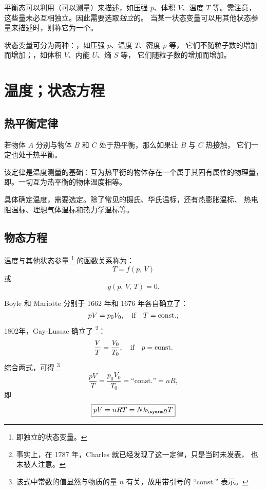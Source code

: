 平衡态可以利用（可以测量）来描述，如压强 $p$、体积 $V$、温度 $T$
等。需注意，这些量未必互相独立。因此需要选取\emph{独立}的。
当某一状态变量可以用其他状态参量来描述时，则称它为一个。

状态变量可分为两种：，如压强 $p$、温度 $T$、密度 $\rho$ 等，
它们不随粒子数的增加而增加；，如体积 $V$、内能 $U$、熵 $S$ 等，
它们随粒子数的增加而增加。

\section{温度；状态方程}

\subsection{热平衡定律}

\begin{theorem}
  若物体 $A$ 分别与物体 $B$ 和 $C$ 处于热平衡，那么如果让 $B$ 与 $C$ 热接触，
  它们一定也处于热平衡。
\end{theorem}

该定律是温度测量的基础：互为热平衡的物体存在一个属于其固有属性的物理量，
即。一切互为热平衡的物体温度相等。

具体确定温度，需要选定。除了常见的摄氏、华氏温标，还有热膨胀温标、
热电阻温标、理想气体温标和热力学温标等。

\subsection{物态方程}

温度与其他状态参量 \footnote{即独立的状态变量。} 的函数关系称为：
\begin{equation}
  T = f(p, \, V)
\end{equation}
或
\begin{equation}
  g(p, \, V, \, T) = 0.
\end{equation}

Boyle 和 Mariotte 分别于 1662 年和 1676 年各自确立了：
\begin{equation}
  pV = p_0 V_0 \qc\qif* T = \const;
\end{equation}
1802年，Gay-Lussac 确立了
\footnote{事实上，在 1787 年，Charles 就已经发现了这一定律，只是当时未发表，
  也未被人注意。}：
\begin{equation}
  \frac{V}{T} = \frac{V_0}{T_0} \qc\qif* p = \const
\end{equation}
综合两式，可得
\footnote{该式中常数的值显然与物质的量 $n$ 有关，故用带引号的
  $\text{``const.''}$ 表示。}
\begin{equation} \label{eq:ideal-gas-law-a}
  \frac{p V}{T} = \frac{p_0 V_0}{T_0} = \text{``const.''} = n R,
\end{equation}
即
\begin{equation} \label{eq:ideal-gas-law-b}
  \boxed{pV = nRT = N \kB T}
\end{equation}

